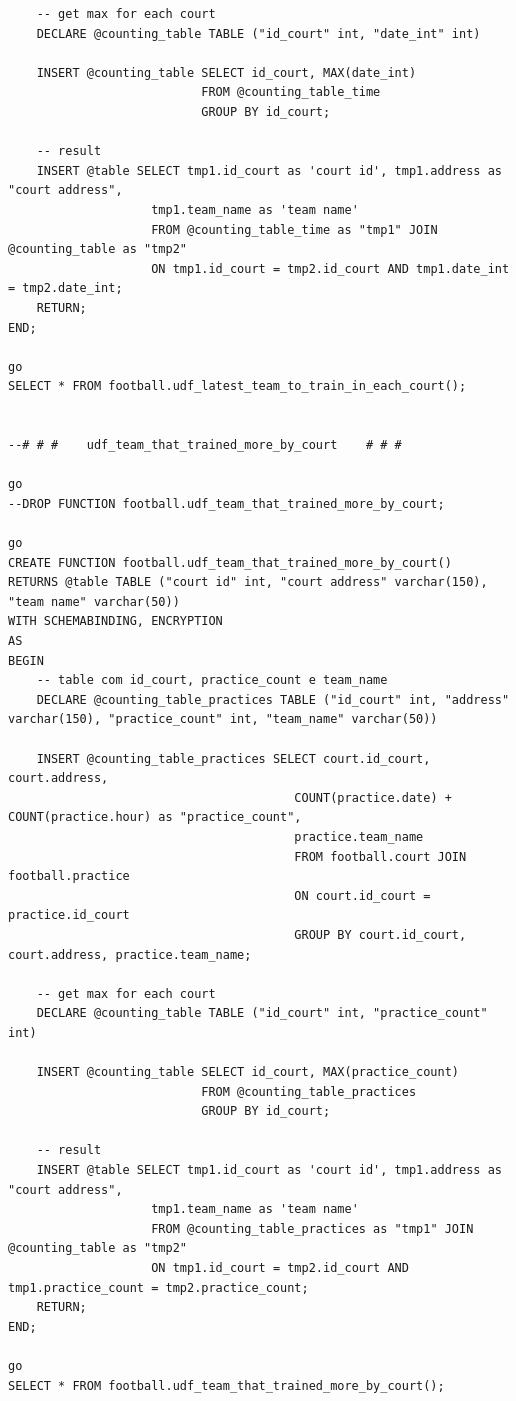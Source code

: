 \documentclass[pdftex,12pt,a4paper]{report}
\begin{document}
\begin{lstlisting}
	-- get max for each court
	DECLARE @counting_table TABLE ("id_court" int, "date_int" int)

	INSERT @counting_table SELECT id_court, MAX(date_int)
						   FROM @counting_table_time
						   GROUP BY id_court;

	-- result
	INSERT @table SELECT tmp1.id_court as 'court id', tmp1.address as "court address",
					tmp1.team_name as 'team name'
					FROM @counting_table_time as "tmp1" JOIN @counting_table as "tmp2"
					ON tmp1.id_court = tmp2.id_court AND tmp1.date_int = tmp2.date_int;
	RETURN;
END;

go
SELECT * FROM football.udf_latest_team_to_train_in_each_court();


--# # #    udf_team_that_trained_more_by_court    # # #

go
--DROP FUNCTION football.udf_team_that_trained_more_by_court;

go
CREATE FUNCTION football.udf_team_that_trained_more_by_court()
RETURNS @table TABLE ("court id" int, "court address" varchar(150),  "team name" varchar(50))
WITH SCHEMABINDING, ENCRYPTION
AS
BEGIN
	-- table com id_court, practice_count e team_name
	DECLARE @counting_table_practices TABLE ("id_court" int, "address" varchar(150), "practice_count" int, "team_name" varchar(50))
	
	INSERT @counting_table_practices SELECT court.id_court, court.address,
										COUNT(practice.date) + COUNT(practice.hour) as "practice_count",
										practice.team_name
										FROM football.court JOIN football.practice
										ON court.id_court = practice.id_court
										GROUP BY court.id_court, court.address, practice.team_name;

	-- get max for each court
	DECLARE @counting_table TABLE ("id_court" int, "practice_count" int)

	INSERT @counting_table SELECT id_court, MAX(practice_count)
						   FROM @counting_table_practices
						   GROUP BY id_court;

	-- result
	INSERT @table SELECT tmp1.id_court as 'court id', tmp1.address as "court address",
					tmp1.team_name as 'team name'
					FROM @counting_table_practices as "tmp1" JOIN @counting_table as "tmp2"
					ON tmp1.id_court = tmp2.id_court AND tmp1.practice_count = tmp2.practice_count;
	RETURN;
END;

go
SELECT * FROM football.udf_team_that_trained_more_by_court();

\end{lstlisting}
\end{document}
